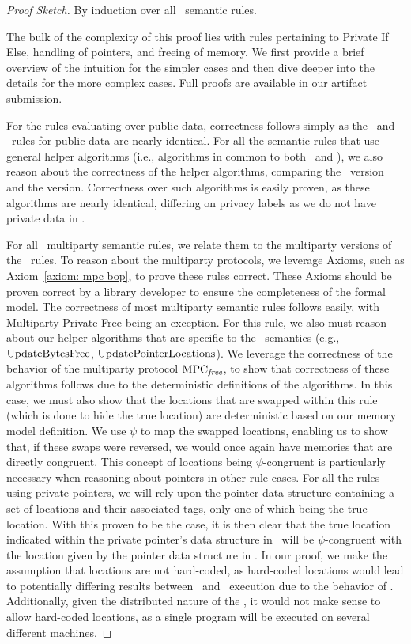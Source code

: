 \begin{proof}[Proof Sketch]
By induction over all \piccoC\ semantic rules. 

The bulk of the complexity of this proof lies with rules pertaining to Private If Else, handling of pointers, and freeing of memory.  We first provide a brief overview of the intuition for the simpler cases and then dive deeper
into the details for the more complex cases.  Full proofs are available in our artifact submission.

For the rules evaluating over public data, correctness follows simply as the \vanillaC\ and \piccoC\ rules for public data are nearly identical. For all the semantic rules that use general helper algorithms (i.e., algorithms in common to both \vanillaC\ and \piccoC), we also reason about the correctness of the helper algorithms, comparing the \vanillaC\ version and the \piccoC version. Correctness over such algorithms is easily proven, as these algorithms are nearly identical, differing on privacy labels as we do not have private data in \vanillaC. 

For all \piccoC\ multiparty semantic rules, we relate them to the multiparty versions of the \vanillaC\ rules. To reason about the multiparty protocols, we leverage Axioms, such as Axiom~\ref{axiom: mpc bop}, to prove these rules correct. These Axioms should be proven correct by a library developer to ensure the completeness of the formal model. The correctness of most multiparty semantic rules follows easily, with Multiparty Private Free being an exception. For this rule, we also must reason about our helper algorithms that are specific to the \piccoC\ semantics (e.g., $\mathrm{UpdateBytesFree}$, $\mathrm{UpdatePointerLocations}$). We leverage the correctness of the behavior of the multiparty protocol $\mathrm{MPC}_\mathit{{free}}$, to show that correctness of these algorithms follows due to the deterministic definitions of the algorithms. In this case, we must also show that the locations that are swapped within this rule (which is done to hide the true location) are deterministic based on our memory model definition. We use $\psi$ to map the swapped locations, enabling us to show that, if these swaps were reversed, we would once again have memories that are directly congruent. This concept of locations being $\psi$-congruent is particularly necessary when reasoning about pointers in other rule cases. 
For all the rules using private pointers, we will rely upon the pointer data structure containing a set of locations and their associated tags, only one of which being the true location. With this proven to be the case, it is then clear that the true location indicated within the private pointer's data structure in \piccoC\ will be $\psi$-congruent  with the location given by the pointer data structure in \vanillaC.
In our proof, we make the assumption that locations are not hard-coded, as hard-coded locations would lead to potentially differing results between \vanillaC\ and \piccoC\ execution due to the behavior of . Additionally, given the distributed nature of the \piccoC, it would not make sense to allow hard-coded locations, as a single program will be executed on several different machines.


\end{proof}
